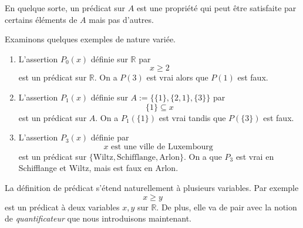 \documentclass[french,course,oneside,theoremnosection]{lecture}
\newcommand{\R}{\mathbb{R}}
\begin{document}
En quelque sorte, un prédicat sur $A$ est une propriété qui peut être satisfaite par certains éléments de $A$ mais pas d'autres.

\begin{example}\label{ex:predi}
Examinons quelques exemples de nature variée.
\begin{enumerate}[(1)]
\item L'assertion $P_0(x)$ définie sur $\R$ par 
\[
x\geq 2
\]
est un prédicat sur $\R$. On a $P(3)$ est vrai alors que $P(1)$ est faux.

\item L'assertion $P_1(x)$ définie sur $A:=\{\{1\}, \{2,1\}, \{3\}\}$ par
\[
\{1\} \subseteq x
\]
est un prédicat sur $A$. On a $P_1(\{1\})$ est vrai tandis que $P(\{3\})$ est faux. 
\item L'assertion $P_3(x)$ définie par 
\[
x \text{ est une ville de Luxembourg }
\]
est un prédicat sur $\{\text{Wiltz}, \text{Schifflange}, \text{Arlon}\}$. On a que $P_3$ est vrai en Schifflange et Wiltz, mais est faux en Arlon.
\end{enumerate}
\end{example}

La définition de prédicat s'étend naturellement à plusieurs variables. Par exemple 
\[
x\geq y
\]
est un prédicat à deux variables $x, y$ sur $\R$. De plus, elle va de pair avec la notion de \emph{quantificateur} que nous introduisons maintenant.
\end{document}
